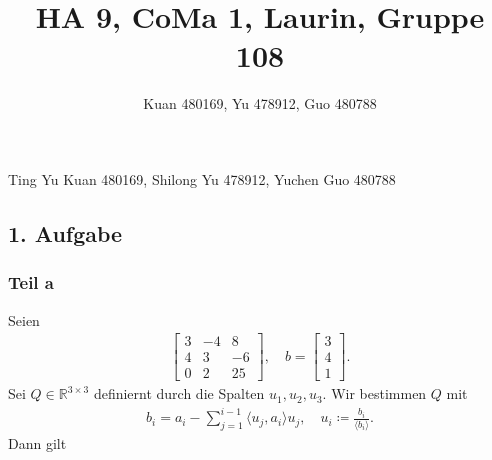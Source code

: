 \documentclass[fleqn,draft,a5paper]{article}
\title{HA 9, CoMa 1, Laurin, Gruppe 108}
\author{Kuan 480169, Yu 478912, Guo 480788}
\providecommand{\skp}[1]{\langle#1\rangle}
\theoremstyle{remark}
\begin{document}
\maketitle
\begin{center}
Ting Yu Kuan 480169, Shilong Yu 478912, Yuchen Guo 480788
\end{center}
\newpage
\subsection{1. Aufgabe}
\subsubsection{Teil a}
Seien
\begin{align*}
  \begin{bmatrix}
    3 & -4 & 8 \\
    4 & 3 & -6 \\
    0 & 2 & 25
  \end{bmatrix},
  \quad
  b =
  \begin{bmatrix}
    3 \\ 4 \\ 1
  \end{bmatrix}.
\end{align*}
Sei \(Q \in \mathbb{R}^{3 \times 3}\) definiernt durch die Spalten \(u_{1}, u_{2},
u_{3}\).  Wir bestimmen \(Q\) mit
\begin{align*}
  b_{i} = a_{i} - \sum_{j=1}^{i-1}{\skp{u_{j}, a_{i}}u_{j}}, \quad u_{i} \coloneq \frac{b_{i}}{\skp{b_{i}}}.
\end{align*}
Dann gilt
\end{document}
